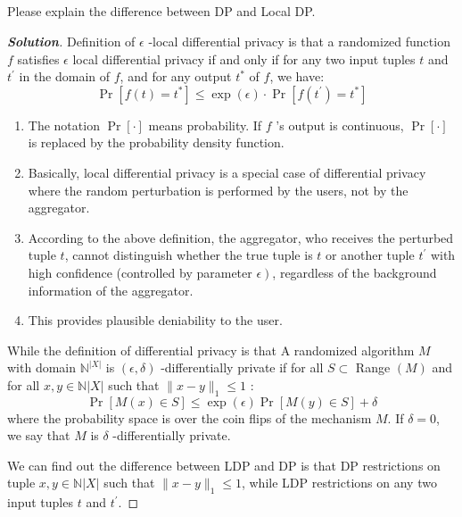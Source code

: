 \documentclass{ctexart}
\newenvironment{solution}{\begin{proof}[\indent\bf Solution]}{\end{proof}}
\begin{document}
\subsection{}
Please explain the difference between DP and Local DP.
\begin{solution}
    Definition of $\epsilon$ -local differential privacy is that a randomized function $f$ satisfies $\epsilon$ local differential privacy if and only if for
    any two input tuples $t$ and $t^{\prime}$ in the domain of $f$, and for any output $t^{*}$ of $f$, we have:
    $$
        \operatorname{Pr}\left[f(t)=t^{*}\right] \leq \exp (\epsilon) \cdot \operatorname{Pr}\left[f\left(t^{\prime}\right)=t^{*}\right]
    $$
    \begin{enumerate}
        \item The notation $\operatorname{Pr}[\cdot]$ means probability. If $f$ 's output is continuous, $\operatorname{Pr}[\cdot]$ is replaced by the probability density function.
        \item  Basically, local differential privacy is a special case of differential privacy where the random perturbation is performed by the users, not by the aggregator.
        \item  According to the above definition, the aggregator, who receives the perturbed tuple $t$, cannot distinguish whether the true tuple is $t$ or another tuple $t^{\prime}$ with high confidence (controlled by parameter $\left.\epsilon\right)$, regardless of the background information of the aggregator.
        \item This provides plausible deniability to the user.
    \end{enumerate}
    While the definition of differential privacy is that A randomized algorithm $M$ with domain $\mathbb{N}^{|X|}$ is $(\epsilon, \delta)$ -differentially private if for all $S \subset$ Range $(M)$ and for all $x, y \in \mathbb{N}|X|$ such that $\|x-y\|_{1} \leq 1$ :
    $$
        \operatorname{Pr}[M(x) \in S] \leq \exp (\epsilon) \operatorname{Pr}[M(y) \in S]+\delta
    $$
    where the probability space is over the coin flips of the mechanism $M$. If $\delta=0$, we say that $M$ is $\delta$ -differentially private.
    \par We can find out the difference between LDP and DP is that
    DP restrictions on tuple $x, y \in \mathbb{N}|X|$ such that $\|x-y\|_{1} \leq 1$, while LDP restrictions on any two input tuples $t$ and $t^{\prime}$.

\end{solution}
\end{document}

